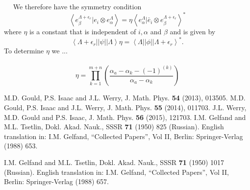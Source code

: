 \documentclass[12pt]{article}
\begin{document}
~~
We therefore have the symmetry condition
$$
\left\langle e^{\Lambda+\epsilon_r}_\beta | e_i \otimes e^{\Lambda}_\alpha \right\rangle
= \eta \left\langle e^{\Lambda}_\alpha | \bar{e}_i \otimes e^{\Lambda+\epsilon_r}_\beta \right\rangle^*
$$
where $\eta$ is a constant that is independent of $i, \alpha$ and $\beta$ and is given by
$$
\left \langle \Lambda + \epsilon_r || \psi || \Lambda \right \rangle \eta = \left \langle \Lambda || \phi || \Lambda + \epsilon_r \right \rangle^*.
$$
To determine $\eta$ we ...
~~\\
~~\\
$$
\eta = \prod^{m+n}_{k=1} 
\left( 
\frac
{\alpha_a - \alpha_k - (-1)^{(k)}}
{\alpha_a - \alpha_k}
\right)
$$




\newpage
\begin{thebibliography}{10}

%
%
% 
 M.D. Gould, P.S. Isaac and J.L. Werry, J. Math. Phys. {\bf 54} (2013), 013505.
% 
 M.D. Gould, P.S. Isaac and J.L. Werry, J. Math. Phys. {\bf 55} (2014), 011703.
%
 J.L. Werry, M.D. Gould and P.S. Isaac, J. Math. Phys. {\bf 56} (2015), 121703.
% 
%  
%
% 
%  
%  
I.M. Gelfand and M.L. Tsetlin, Dokl. Akad. Nauk., SSSR {\bf 71} (1950) 825 (Russian).
English translation in: I.M. Gelfand, ``Collected Papers'', Vol II, Berlin:
Springer-Verlag (1988) 653.
  
I.M. Gelfand and M.L. Tsetlin, Dokl. Akad. Nauk., SSSR {\bf 71} (1950) 1017 (Russian).
English translation in: I.M. Gelfand, ``Collected Papers'', Vol II, Berlin:
Springer-Verlag (1988) 657.
  

\end{thebibliography}
\end{document}
